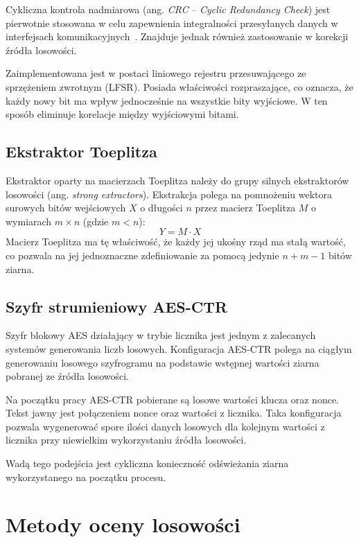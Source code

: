 \noindent Cykliczna kontrola nadmiarowa (ang. \textit{CRC} -- \textit{Cyclic Redundancy Check}) jest 
pierwotnie stosowana w celu zapewnienia integralności przesyłanych danych w 
interfejsach komunikacyjnych~\cite{ucgosu-CRC}. Znajduje jednak również 
zastosowanie w korekcji źródła losowości. 

Zaimplementowana jest w postaci liniowego rejestru przesuwającego ze 
sprzężeniem zwrotnym (LFSR). Posiada właściwości rozpraszające, co oznacza, że każdy nowy 
bit ma wpływ jednocześnie na wszystkie bity wyjściowe. W ten sposób eliminuje 
korelacje między wyjściowymi bitami.


\subsection{Ekstraktor Toeplitza}

\noindent Ekstraktor oparty na macierzach Toeplitza należy do grupy silnych 
ekstraktorów losowości (ang. \emph{strong extractors}). Ekstrakcja polega na 
pomnożeniu wektora surowych bitów wejściowych $X$ o długości $n$ przez macierz 
Toeplitza $M$ o wymiarach $m \times n$ (gdzie $m < n$):
\begin{equation}
    Y = M \cdot X
\end{equation}
Macierz Toeplitza ma tę właściwość, że każdy jej ukośny rząd ma stałą wartość, 
co pozwala na jej jednoznaczne zdefiniowanie za pomocą jedynie $n + m - 1$ 
bitów ziarna.

\subsection{Szyfr strumieniowy AES-CTR}

\noindent Szyfr blokowy AES działający w trybie licznika jest jednym z zalecanych 
systemów generowania liczb losowych. Konfiguracja AES-CTR polega na ciągłym generowaniu 
losowego szyfrogramu na podstawie wstępnej wartości ziarna pobranej ze źródła 
losowości. 

Na początku pracy AES-CTR pobierane są losowe wartości klucza oraz nonce. Tekst jawny jest 
połączeniem nonce oraz wartości z licznika. Taka konfiguracja pozwala 
wygenerować spore ilości danych losowych dla kolejnym wartości z licznika 
przy niewielkim wykorzystaniu źródła losowości. 

Wadą tego podejścia jest cykliczna konieczność odświeżania ziarna wykorzystanego 
na początku procesu.  

\section{Metody oceny losowości}

